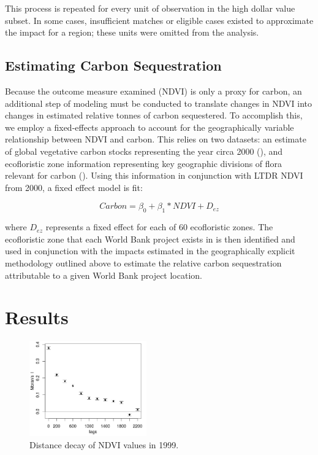 \documentclass{article}\usepackage[]{graphicx}\usepackage[]{color}
\newenvironment{knitrout}{}{}  %
\begin{document}
\begin{knitrout}
This process is repeated for every unit of observation in the high dollar value subset.  
In some cases, insufficient matches or eligible cases existed to approximate the impact for a region; these units were omitted from the analysis.

\subsection{Estimating Carbon Sequestration}
Because the outcome measure examined (NDVI) is only a proxy for carbon, an additional step of modeling must be conducted to translate changes in NDVI into changes in estimated relative tonnes of carbon sequestered.
To accomplish this, we employ a fixed-effects approach to account for the geographically variable relationship between NDVI and carbon.
This relies on two datasets: an estimate of global vegetative carbon stocks representing the year circa 2000 (\cite{saatchi_benchmark_2011}), and ecofloristic zone information representing key geographic divisions of flora relevant for carbon (\cite{ruesch_new_2008}).
Using this information in conjunction with LTDR NDVI from 2000, a fixed effect model is fit:

\begin{equation}
Carbon = \beta_{0} + \beta_{1} * NDVI + D_{ez}
\label{EQcarb}
\end{equation}

where \begin{math}D_{ez}\end{math} represents a fixed effect for each of 60 ecofloristic zones.  
The ecofloristic zone that each World Bank project exists in is then identified and used in conjunction with the impacts estimated in the geographically explicit methodology outlined above to estimate the relative carbon sequestration attributable to a given World Bank project location.

\newpage
\section{Results}

\begin{figure}
\centering
 \includegraphics[width=0.45\textwidth]{pre_avg_NDVI_max_full}
\caption{Distance decay of NDVI values in 1999.}
  \label{DDFig}
\end{figure}


\end{knitrout}
\end{document}
